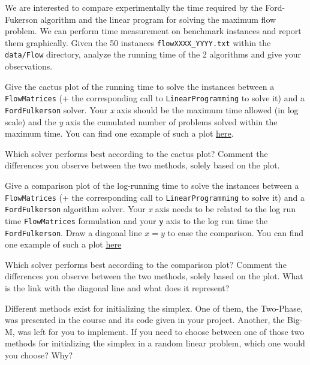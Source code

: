 \documentclass[12pt]{report}
\newcommand{\answerbox}[2]{\hfill\break\\
	\framebox[\linewidth]{\parbox[c][#1][c]{\dimexpr\linewidth-2\fboxsep-2\fboxrule}{#2}}
}
\begin{document}
	\begin{Exercise}[title={Experimental comparison LP vs Dedicated Algorithm}]

		We are interested to compare experimentally the time required by the Ford-Fukerson algorithm and the linear program for solving
		the maximum flow problem. We can perform time measurement on benchmark instances and report them graphically.
		Given the 50 instances \texttt{flowXXXX\_YYYY.txt} within the \texttt{data/Flow} directory, analyze the running time of the 2 algorithms and give your observations.


		\Question Give the cactus plot of the running time to solve the instances between a \texttt{FlowMatrices} (+ the corresponding call to \texttt{LinearProgramming} to solve it) and a \texttt{FordFulkerson} solver. Your \textit{x} axis should be the maximum time allowed (in log scale) and the \textit{y} axis the cumulated number of problems solved within the maximum time. You can find one example of such a plot \href{https://jeremiasberg.files.wordpress.com/2021/10/cactus_plot_side_v4.jpg?w=346&h=205}{here}.
		\answerbox{8cm}{
		}

		\Question Which solver performs best according to the cactus plot? Comment the differences you observe between the two methods, solely based on the plot.
		\answerbox{2.5cm}{
		}

		\pagebreak

		\Question Give a comparison plot of the log-running time to solve the instances between a \texttt{FlowMatrices} (+ the corresponding call to \texttt{LinearProgramming} to solve it) and a \texttt{FordFulkerson} algorithm solver. Your \textit{x} axis needs to be related to the log run time \texttt{FlowMatrices} formulation and your \texttt{y} axis to the log run time the \texttt{FordFulkerson}. Draw a diagonal line $x=y$ to ease the comparison. You can find one example of such a plot \href{https://www.researchgate.net/profile/Gael-Glorian/publication/335984300/figure/fig3/AS:827659797925888@1574340881515/Picasso-vs-gc-cdcl.png}{here}
		\answerbox{8cm}{
		}

		\Question Which solver performs best according to the comparison plot? Comment the differences you observe between the two methods, solely based on the plot. What is the link with the diagonal line and what does it represent?
		\answerbox{2.5cm}{
		}


	\end{Exercise}

	\begin{Exercise}[title={Initialisation : Big-M VS Two-Phase}]

		\Question Different methods exist for initializing the simplex. One of them, the Two-Phase, was presented in the course and its code given in your project. Another, the Big-M, was left for you to implement.
		If you need to choose between one of those two methods for initializing the simplex in a random linear problem, which one would you choose? Why?
		\answerbox{3.5cm}{
		}

	\end{Exercise}
\end{document}
